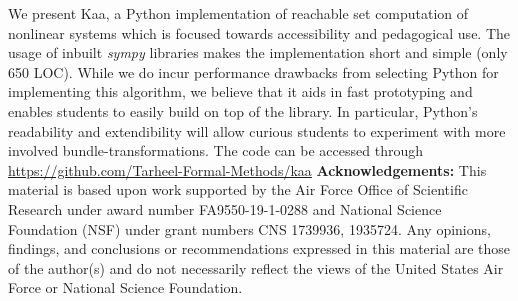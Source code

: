 \documentclass[EPiC]{easychair}
\begin{document}
We present Kaa, a Python implementation of reachable set computation of nonlinear systems which is focused towards accessibility and pedagogical use.
%
The usage of inbuilt \emph{sympy} libraries makes the implementation short and simple (only 650 LOC).
%
While we do incur performance drawbacks from selecting Python for implementing this algorithm, we believe that it aids in fast prototyping and enables students to easily build on top of the library. In particular, Python's readability and extendibility will allow curious students to experiment with more involved bundle-transformations. 
%
The code can be accessed through \url{https://github.com/Tarheel-Formal-Methods/kaa}
\newline
\newline
{\bf Acknowledgements: } This material is based upon work supported by the Air Force Office of Scientific Research under award number FA9550-19-1-0288 and National Science Foundation (NSF) under grant numbers CNS 1739936, 1935724. Any opinions, findings, and conclusions or recommendations expressed in this material are those of the author(s) and do not necessarily reflect the views of the United States Air Force or National Science Foundation. 



\newpage
\end{document}
